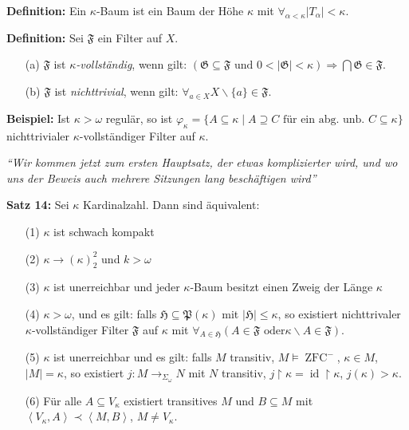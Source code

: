 \documentclass[a4paper,fontsize=11pt]{scrartcl}
\newcommand{\ZFC}{\operatorname{ZFC}}
\newcommand{\id}{\operatorname{id}}
\begin{document}
{\bf Definition:} Ein $\kappa$-Baum ist ein Baum der Höhe $\kappa$ mit
$\forall_{\alpha<\kappa} |T_\alpha|<\kappa$.

{\bf Definition:} Sei $\mathfrak{F}$ ein Filter auf $X$.
\begin{itemize}
  \item[(a)] $\mathfrak{F}$ ist {\it $\kappa$-vollständig}, wenn gilt:
    $(\mathfrak{G}\subseteq\mathfrak{F}\mbox{ und }
    0<|\mathfrak{G}|<\kappa)\Rightarrow\bigcap\mathfrak{G}\in\mathfrak{F}$.
  \item[(b)] $\mathfrak{F}$ ist {\it nichttrivial}, wenn gilt:
    $\forall_{a\in X} X\backslash\{a\}\in\mathfrak{F}$.
\end{itemize}

{\bf Beispiel:} Ist $\kappa>\omega$ regulär, so ist
$\varphi_\kappa=\{A\subseteq\kappa\mid A\supseteq C\mbox{ für ein
  abg. unb. }C\subseteq\kappa\}$ nichttrivialer $\kappa$-vollständiger
Filter auf $\kappa$.

{\it ``Wir kommen jetzt zum ersten Hauptsatz, der etwas komplizierter
  wird, und wo uns der Beweis auch mehrere Sitzungen lang beschäftigen
  wird''}

{\bf Satz 14:} Sei $\kappa$ Kardinalzahl. Dann sind äquivalent:
\begin{itemize}
\item[(1)] $\kappa$ ist schwach kompakt
\item[(2)] $\kappa\rightarrow(\kappa)_2^2$ und $k>\omega$
\item[(3)] $\kappa$ ist unerreichbar und jeder $\kappa$-Baum besitzt
  einen Zweig der Länge $\kappa$
\item[(4)] $\kappa>\omega$, und es gilt: falls
  $\mathfrak{H}\subseteq\mathfrak{P}(\kappa)$ mit
  $|\mathfrak{H}|\le\kappa$, so existiert nichttrivaler
  $\kappa$-vollständiger Filter $\mathfrak{F}$ auf $\kappa$ mit
  $\forall_{A\in\mathfrak{H}}(A\in\mathfrak{F}\mbox{ oder
}\kappa\backslash A\in\mathfrak{F})$.
\item[(5)] $\kappa$ ist unerreichbar und es gilt: falls $M$ transitiv,
  $M\models\ZFC^-$, $\kappa\in M$, $|M|=\kappa$, so existiert
  $j:M\rightarrow_{\Sigma_\omega} N$ mit $N$ transitiv,
  $j\upharpoonright\kappa=\id\upharpoonright\kappa$,
  $j(\kappa)>\kappa$.
\item[(6)] Für alle $A\subseteq V_\kappa$ existiert transitives $M$
  und $B\subseteq M$ mit
  $\left<V_\kappa,A\right>\prec\left<M,B\right>$, $M\neq V_\kappa$.
\end{itemize}
\end{document}
